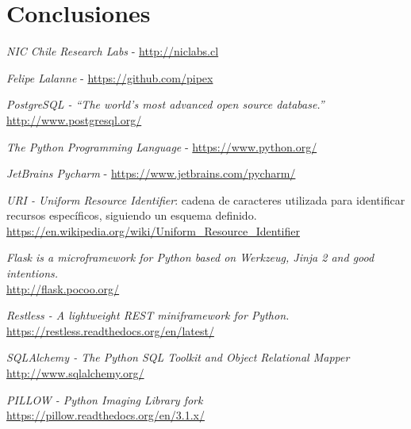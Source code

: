 \documentclass[11pt,letterpaper]{article}
\begin{document}
\section{Conclusiones}
\newpage
\begin{thebibliography}{5}
     \emph{NIC Chile Research Labs} - \url{http://niclabs.cl}

     \emph{Felipe Lalanne} - \url{https://github.com/pipex}

     \emph{PostgreSQL - ``The world's most advanced open source database.''}\\ \url{http://www.postgresql.org/}

     \emph{The Python Programming Language} - \url{https://www.python.org/}

     \emph{JetBrains Pycharm} - \url{https://www.jetbrains.com/pycharm/}

     \emph{URI - Uniform Resource Identifier}: cadena de caracteres utilizada para identificar recursos específicos, siguiendo un esquema definido.\\ \url{https://en.wikipedia.org/wiki/Uniform_Resource_Identifier}

	 \emph{Flask is a microframework for Python based on Werkzeug, Jinja 2 and good intentions.}\\ \url{http://flask.pocoo.org/}

     \emph{Restless - A lightweight REST miniframework for Python.}\\ \url{https://restless.readthedocs.org/en/latest/}

    \emph{SQLAlchemy - The Python SQL Toolkit and Object Relational Mapper}\\ \url{http://www.sqlalchemy.org/}

    \emph{PILLOW - Python Imaging Library fork}\\ \url{https://pillow.readthedocs.org/en/3.1.x/}
\end{thebibliography}


\end{document}
